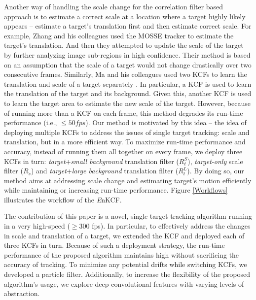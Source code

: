 \documentclass[10pt,twocolumn,letterpaper]{article}
\begin{document}
Another way of handling the scale change for the correlation filter
based approach is to estimate a correct scale at a location where a
target highly likely appears \cite{zhang2014fast} -- estimate a
target's translation first and then estimate correct scale. For
example, Zhang and his colleagues used the MOSSE tracker
\cite{bolme2010visual} to estimate the target's translation. And then
they attempted to update the scale of the target by further analyzing
image sub-regions in high confidence. Their method is based on an
assumption that the scale of a target would not change drastically over two
consecutive frames. Similarly, Ma and his colleagues used two KCFs to
learn the translation and scale of a target separately
\cite{ma2015long}. In particular, a KCF is used to learn the
translation of the target and its background. Given this, another KCF
is used to learn the target area to estimate the new scale of the
target. However, because of running more than a KCF on each frame,
this method degrades its run-time performance (i.e., $\leq 50
fps$). Our method is motivated by this idea -- the idea of deploying
multiple KCFs to address the issues of single target tracking: scale
and translation, but in a more efficient way. To maximize run-time
performance and accuracy, instead of running them all together on
every frame, we deploy three KCFs in turn:
\textit{target}+\textit{small background} translation filter
($R_{t}^{S}$), \textit{target-only} scale filter ($R_{s}$) and
\textit{target}+\textit{large background} translation filter
($R_{t}^{L}$). By doing so, our method aims at addressing scale
change and estimating target's motion efficiently while maintaining or
increasing run-time performance. Figure \ref{Workflows} illustrates
the workflow of the {\it E}nKCF.

The contribution of this paper is a novel, single-target tracking
algorithm running in a very high-speed ($\geq300$ fps). In particular,
to effectively address the changes in scale and translation of a
target, we extended the KCF and deployed each of three KCFs in
turn. Because of such a deployment strategy, the run-time performance
of the proposed algorithm maintains high without sacrificing the
accuracy of tracking. To minimize any potential drifts while switching
KCFs, we developed a particle filter. Additionally, to increase the
flexibility of the proposed algorithm's usage, we explore deep
convolutional features with varying levels of abstraction.

\end{document}
